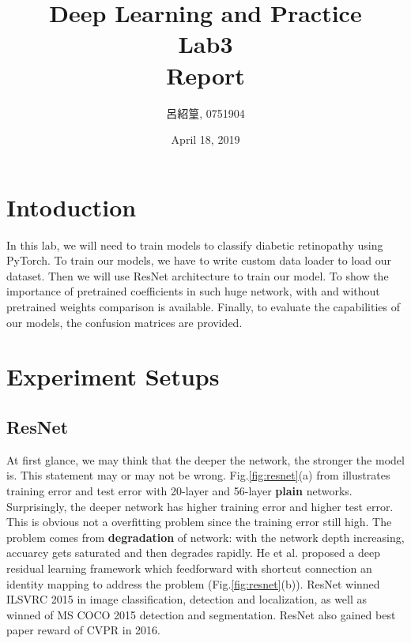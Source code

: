 \documentclass[12pt,a4paper]{article}
\title{Deep Learning and Practice \\Lab3 \\ Report}
\date{April 18, 2019}
\author{呂紹篁, 0751904}
\begin{document}
\thispagestyle{plain}
\cfoot{}
\maketitle

\section{Intoduction} \label{sec:intro}
In this lab, we will need to train models to classify diabetic retinopathy using PyTorch. To train our models, we have to write custom data loader to load our dataset. Then we will use ResNet \cite{he2016deep} architecture to train our model. To show the importance of pretrained coefficients in such huge network, with and without pretrained weights comparison is available. Finally, to evaluate the capabilities of our models, the confusion matrices are provided. 
\section{Experiment Setups} \label{sec:exp_setup}
\subsection{ResNet}
At first glance, we may think that the deeper the network, the stronger the model is. This statement may or may not be wrong. Fig.\ref{fig:resnet}(a) from \cite{he2016deep} illustrates training error and test error with 20-layer and 56-layer \textbf{plain} networks. Surprisingly, the deeper network has higher training error and higher test error. This is obvious not a overfitting problem since the training error still high. The problem comes from \textbf{degradation} of network: with the network depth increasing, accuarcy gets saturated and then degrades rapidly. 
He et al. proposed a deep residual learning framework which feedforward with shortcut connection an identity mapping to address the problem (Fig.\ref{fig:resnet}(b)). ResNet winned ILSVRC 2015 in image classification, detection and localization, as well as winned of MS COCO 2015 detection and segmentation. ResNet also gained best paper reward of CVPR in 2016. 
\end{document}
